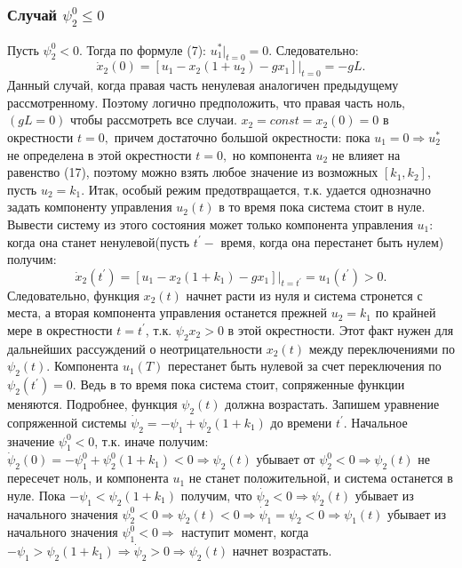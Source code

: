 \documentclass[11pt]{article}
\begin{document}
{ \subsubsection{Случай $\psi_2^0 \leq 0$}
 {Пусть $\psi_2^0 < 0.$ Тогда по формуле (7): $u_1^*|_{t = 0} = 0$. Следовательно:}
 \begin{equation}
 \dot{x}_2(0) = [u_1 - x_2(1 + u_2) - gx_1]|_{t = 0} = -gL.
 \end{equation}
 {Данный случай, когда правая часть ненулевая аналогичен предыдущему рассмотренному. Поэтому логично предположить, что правая часть ноль, $(gL = 0)$ чтобы рассмотреть все случаи. $x_2 = const = x_2(0) = 0$ в окрестности $t = 0,$ причем достаточно большой окрестности: пока $u_1 = 0 \Rightarrow u_2^*$ не определена в этой окрестности $t = 0,$ но компонента $u_2$ не влияет на равенство (17), поэтому можно взять любое значение из возможных $[k_1,k_2],$ пусть $u_2 = k_1$. Итак, особый режим предотвращается, т.к. удается однозначно задать компоненту управления $u_2(t)$ в то время пока система стоит в нуле.
\newline
Вывести систему из этого состояния может только компонента управления $u_1:$ когда она станет ненулевой(пусть $t^{'}-$ время, когда она перестанет быть нулем) получим: 
\[ \dot{x}_2(t^{'}) = [u_1 - x_2(1 + k_1) - gx_1]|_{t = t^{'}} = u_1(t^{'}) > 0. \]
Следовательно, функция $x_2(t)$ начнет расти из нуля и система стронется с места, а вторая компонента управления останется прежней $u_2 = k_1$ по крайней мере в окрестности $t = t^{'}$, т.к. $\psi_2 x_2 >0$ в этой окрестности. Этот факт нужен для дальнейших рассуждений о неотрицательности $x_2(t)$ между переключениями по $\psi_2(t)$.
\newline
Компонента $u_1(T)$ перестанет быть нулевой за счет переключения по $\psi_2(t^{'}) = 0.$ Ведь в то время пока система стоит, сопряженные функции меняются. Подробнее, функция $\psi_2(t)$ должна возрастать.
\newline
Запишем уравнение сопряженной системы $\dot{\psi}_2 = - \psi_1 + \psi_2(1 + k_1) $ до времени $t^{'}$. Начальное значение $\psi_1^0 < 0$, т.к. иначе получим: $\dot{\psi}_2(0) = -\psi_1^0 + \psi_2^0(1 + k_1) < 0 \Rightarrow\psi_2(t)$ убывает от $\psi_2^0 < 0\Rightarrow \psi_2(t)$ не пересечет ноль, и компонента $u_1$ не станет положительной, и система останется в нуле.
\newline
Пока $-\psi_1 < \psi_2(1 + k_1)$ получим, что  $\dot{\psi_2} < 0 \Rightarrow \psi_2(t)$ убывает из начального значения $\psi_2^0 < 0 \Rightarrow \psi_2(t) < 0 \Rightarrow \dot{\psi}_1 = \psi_2 < 0 \Rightarrow \psi_1(t)$ убывает из начального значения $\psi_1^0 < 0 \Rightarrow$ наступит момент, когда $-\psi_1 > \psi_2 (1 + k_1)\Rightarrow \dot{\psi}_2 > 0 \Rightarrow \psi_2(t)$ начнет возрастать.
}}
\end{document}
